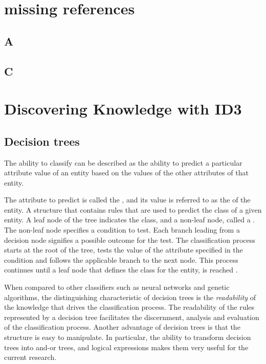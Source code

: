 \chapter{missing references}
\section{A}\label{sec:encoding_examples}

\section{C}\label{tab:attribute_regions}

\chapter{Discovering Knowledge with ID3}

\section{Decision trees}
\label{sec:decision_tree}   
 The ability to classify can be described as the ability to predict a particular attribute value of an entity based on the values of the other attributes of that entity.  

  The attribute to predict is called the , and its value is referred to as the  of the entity. 
 {A structure that contains rules that are used to predict the class of a given entity.  A leaf node of the tree indicates the class, and a non-leaf node, called a . The non-leaf node specifies a condition to test. Each branch leading from a decision node signifies a possible outcome for the test.  The classification process starts at the root of the tree, tests the value of the attribute specified in the condition and follows the applicable branch to the next node. This process continues until a leaf node that defines the class for the entity, is reached \cite{jackson:learning}}.

When compared to other classifiers such as neural networks and genetic algorithms, the distinguishing characteristic of decision trees is the {\sl readability} of the knowledge that drives the classification process.  The readability of the rules represented by a decision tree facilitates the discernment, analysis and evaluation of the classification process.  Another advantage of decision trees is that the structure is easy to manipulate.  In particular, the ability to transform decision trees into and-or trees, and logical expressions makes them very useful for the current research.

